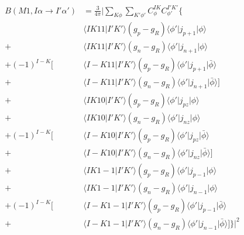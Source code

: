 \documentclass{article}
\begin{document}
\begin{equation*}
    \begin{aligned}
        B(M1, I\alpha \rightarrow I'\alpha')
                           & = \frac{3}{4\pi} \big| \sum_{K\phi} \sum_{K'\phi'} C_{\phi}^{IK} C_{\phi'}^{I'K'}\{                              \\
                           & \langle IK11 \big| I'K' \rangle (g_p-g_R) \langle \phi' \big| j_{p+1} \big| \phi \rangle                         \\
        +                  & \langle IK11 \big| I'K' \rangle (g_n-g_R) \langle \phi' \big| j_{n+1} \big| \phi \rangle                         \\
        + (-1)^{I-K} \big[ & \langle I-K11 \big| I'K' \rangle (g_p-g_R) \langle \phi' \big| j_{p+1} \big| \bar{\phi} \rangle                  \\
        +                  & \langle I-K11 \big| I'K' \rangle (g_n-g_R)  \langle \phi' \big| j_{n+1} \big| \bar{\phi} \rangle \big]           \\
        +                  & \langle IK10 \big| I'K' \rangle (g_p-g_R) \langle \phi' \big| j_{pz} \big| \phi \rangle                          \\
        +                  & \langle IK10 \big| I'K' \rangle (g_n-g_R) \langle \phi' \big| j_{nz} \big| \phi \rangle                          \\
        + (-1)^{I-K} \big[ & \langle I-K10 \big| I'K' \rangle (g_p-g_R) \langle \phi' \big| j_{pz} \big| \bar{\phi} \rangle                   \\
        +                  & \langle I-K10 \big| I'K' \rangle (g_n-g_R) \langle \phi' \big| j_{nz} \big| \bar{\phi}  \rangle \big]            \\
        +                  & \langle IK1-1 \big| I'K' \rangle (g_p-g_R) \langle \phi' \big| j_{p-1} \big| \phi \rangle                        \\
        +                  & \langle IK1-1 \big| I'K' \rangle (g_n-g_R) \langle \phi' \big| j_{n-1} \big| \phi \rangle                        \\
        + (-1)^{I-K} \big[ & \langle I-K1-1 \big| I'K' \rangle (g_p-g_R) \langle \phi' \big| j_{p-1} \big| \bar{\phi} \rangle                 \\
        +                  & \langle I-K1-1 \big| I'K' \rangle (g_n-g_R) \langle \phi' \big| j_{n-1} \big| \bar{\phi} \rangle \big] \}\big|^2
    \end{aligned}
\end{equation*}
\end{document}
